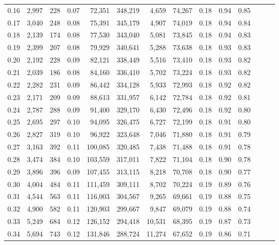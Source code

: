 \begin{tabular}{rrrrrrrrrrrrrr}
0.16 &  2,997 &    228 &  0.07 &   72,351 &  348,219 &   4,659 &  74,267 &  0.18 &  0.94 &      0.85 \\
0.17 &  3,040 &    248 &  0.08 &   75,391 &  345,179 &   4,907 &  74,019 &  0.18 &  0.94 &      0.84 \\
0.18 &  2,139 &    174 &  0.08 &   77,530 &  343,040 &   5,081 &  73,845 &  0.18 &  0.94 &      0.83 \\
0.19 &  2,399 &    207 &  0.08 &   79,929 &  340,641 &   5,288 &  73,638 &  0.18 &  0.93 &      0.83 \\
0.20 &  2,192 &    228 &  0.09 &   82,121 &  338,449 &   5,516 &  73,410 &  0.18 &  0.93 &      0.82 \\
0.21 &  2,039 &    186 &  0.08 &   84,160 &  336,410 &   5,702 &  73,224 &  0.18 &  0.93 &      0.82 \\
0.22 &  2,282 &    231 &  0.09 &   86,442 &  334,128 &   5,933 &  72,993 &  0.18 &  0.92 &      0.82 \\
0.23 &  2,171 &    209 &  0.09 &   88,613 &  331,957 &   6,142 &  72,784 &  0.18 &  0.92 &      0.81 \\
0.24 &  2,787 &    288 &  0.09 &   91,400 &  329,170 &   6,430 &  72,496 &  0.18 &  0.92 &      0.80 \\
0.25 &  2,695 &    297 &  0.10 &   94,095 &  326,475 &   6,727 &  72,199 &  0.18 &  0.91 &      0.80 \\
0.26 &  2,827 &    319 &  0.10 &   96,922 &  323,648 &   7,046 &  71,880 &  0.18 &  0.91 &      0.79 \\
0.27 &  3,163 &    392 &  0.11 &  100,085 &  320,485 &   7,438 &  71,488 &  0.18 &  0.91 &      0.78 \\
0.28 &  3,474 &    384 &  0.10 &  103,559 &  317,011 &   7,822 &  71,104 &  0.18 &  0.90 &      0.78 \\
0.29 &  3,896 &    396 &  0.09 &  107,455 &  313,115 &   8,218 &  70,708 &  0.18 &  0.90 &      0.77 \\
0.30 &  4,004 &    484 &  0.11 &  111,459 &  309,111 &   8,702 &  70,224 &  0.19 &  0.89 &      0.76 \\
0.31 &  4,544 &    563 &  0.11 &  116,003 &  304,567 &   9,265 &  69,661 &  0.19 &  0.88 &      0.75 \\
0.32 &  4,900 &    582 &  0.11 &  120,903 &  299,667 &   9,847 &  69,079 &  0.19 &  0.88 &      0.74 \\
0.33 &  5,249 &    684 &  0.12 &  126,152 &  294,418 &  10,531 &  68,395 &  0.19 &  0.87 &      0.73 \\
0.34 &  5,694 &    743 &  0.12 &  131,846 &  288,724 &  11,274 &  67,652 &  0.19 &  0.86 &      0.71 \\

\end{tabular}
